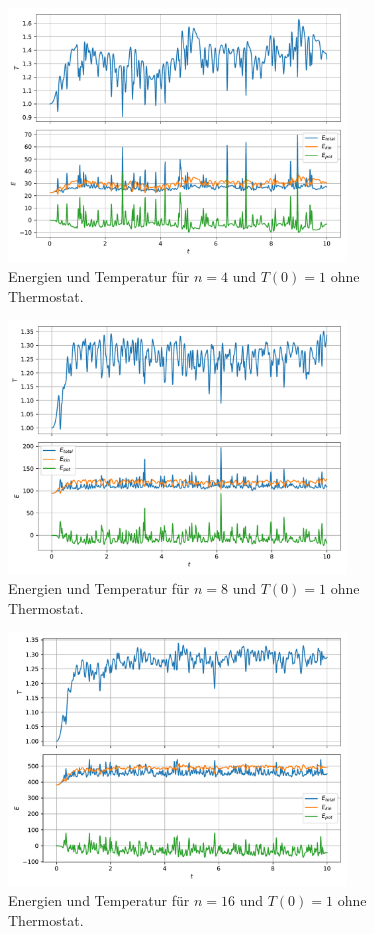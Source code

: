 \begin{figure}
    \centering
    \includegraphics[width=0.8\textwidth]{content/plots/observable_n4_T1_nothermo.pdf}
    \caption{Energien und Temperatur für $n=4$ und $T(0)=1$ ohne Thermostat.}
    \label{fig:obs4}
\end{figure}
\begin{figure}
    \centering
    \includegraphics[width=0.8\textwidth]{content/plots/observable_n8_T1_nothermo.pdf}
    \caption{Energien und Temperatur für $n=8$ und $T(0)=1$ ohne Thermostat.}
    \label{fig:obs8}
\end{figure}
\begin{figure}
    \centering
    \includegraphics[width=0.8\textwidth]{content/plots/observable_n16_T1_nothermo.pdf}
    \caption{Energien und Temperatur für $n=16$ und $T(0)=1$ ohne Thermostat.}
    \label{fig:obs16}
\end{figure}